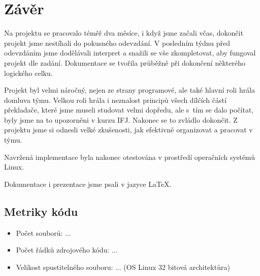 \documentclass[a4paper, 11pt, titlepage]{article}
\begin{document}
\section{Závěr}
Na projektu se pracovalo téměř dva měsíce, i když jsme začali včas, dokončit projekt jsme nestíhali do pokusného odevzdání. V posledním týdnu před odevzdáním jsme dodělávali interpret a snažili se vše zkompletovat, aby fungoval projekt dle zadání. Dokumentace se tvořila průběžně při dokončení některého logického celku. 

Projekt byl velmi náročný, nejen ze strany programové, ale také hlavní roli hrála domluva týmu. Velkou roli hrála i neznalost principů všech dílčích částí překladače, které jsme museli studovat velmi dopředu, ale s~tím se dalo počítat, byly jsme na to upozorněni v kurzu IFJ. Nakonec se to zvládlo dokončit. Z projektu jsme si odnesli velké zkušenosti, jak efektivně organizovat a pracovat v týmu.

Navržená implementace byla nakonec otestována v prostředí operačních systémů Linux.

Dokumentace i prezentace jsme psali v jazyce \LaTeX. 

\subsection{Metriky kódu}
\begin{itemize}
	\item Počet souborů: ...
	\item Počet řádků zdrojového kódu: ...
	\item Velikost spustitelného souboru: ... (OS Linux 32 bitová architektůra)
\end{itemize}  

\nocite{Ahoc2007}
\nocite{ifj_ial}

\end{document}
